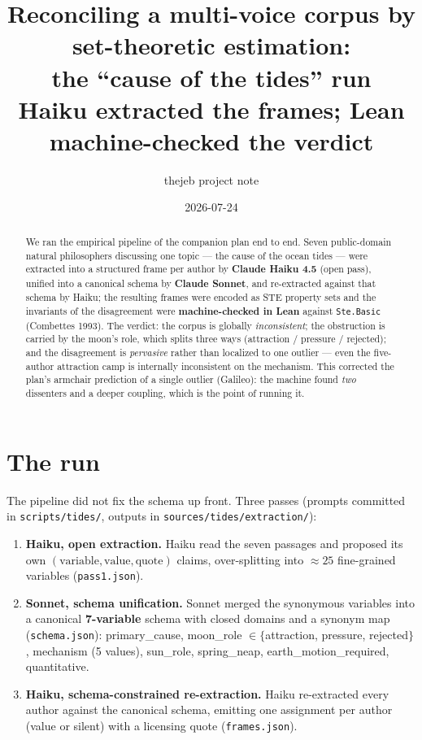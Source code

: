 \documentclass[11pt]{article}
\title{Reconciling a multi-voice corpus by set-theoretic estimation:\\
the ``cause of the tides'' run\\
\large Haiku extracted the frames; Lean machine-checked the verdict}
\author{thejeb project note}
\date{2026-07-24}
\newcommand{\lean}[1]{\texttt{#1}}
\newcommand{\vv}[1]{\textsf{\small #1}}
\begin{document}
\maketitle

\begin{abstract}
We ran the empirical pipeline of the companion plan end to end. Seven
public-domain natural philosophers discussing one topic --- the cause of
the ocean tides --- were extracted into a structured frame per author by
\textbf{Claude Haiku 4.5} (open pass), unified into a canonical schema by
\textbf{Claude Sonnet}, and re-extracted against that schema by Haiku; the
resulting frames were encoded as STE property sets and the invariants of
the disagreement were \textbf{machine-checked in Lean} against
\lean{Ste.Basic} (Combettes 1993). The verdict: the corpus is globally
\emph{inconsistent}; the obstruction is carried by the moon's role, which
splits three ways (attraction / pressure / rejected); and the
disagreement is \emph{pervasive} rather than localized to one outlier ---
even the five-author attraction camp is internally inconsistent on the
mechanism. This corrected the plan's armchair prediction of a single
outlier (Galileo): the machine found \emph{two} dissenters and a deeper
coupling, which is the point of running it.
\end{abstract}

\section{The run}

The pipeline did not fix the schema up front. Three passes (prompts
committed in \lean{scripts/tides/}, outputs in
\lean{sources/tides/extraction/}):

\begin{enumerate}
\item \textbf{Haiku, open extraction.} Haiku read the seven passages and
  proposed its own $(\text{variable},\text{value},\text{quote})$ claims,
  over-splitting into $\approx 25$ fine-grained variables
  (\lean{pass1.json}).
\item \textbf{Sonnet, schema unification.} Sonnet merged the synonymous
  variables into a canonical \textbf{7-variable} schema with closed
  domains and a synonym map (\lean{schema.json}): \vv{primary\_cause},
  \vv{moon\_role} $\in\{$attraction, pressure, rejected$\}$,
  \vv{mechanism} (5 values), \vv{sun\_role}, \vv{spring\_neap},
  \vv{earth\_motion\_required}, \vv{quantitative}.
\item \textbf{Haiku, schema-constrained re-extraction.} Haiku re-extracted
  every author against the canonical schema, emitting one assignment per
  author (value or \vv{silent}) with a licensing quote
  (\lean{frames.json}).
\end{enumerate}
\end{document}

